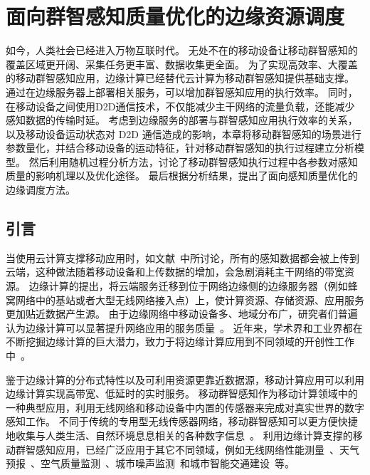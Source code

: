 

\chapter{面向群智感知质量优化的边缘资源调度}

如今，人类社会已经进入万物互联时代。
无处不在的移动设备让移动群智感知的覆盖区域更开阔、采集任务更丰富、数据收集更全面。
为了实现高效率、大覆盖的移动群智感知应用，边缘计算已经替代云计算为移动群智感知提供基础支撑。
通过在边缘服务器上部署相关服务，可以增加群智感知应用的执行效率。
同时，在移动设备之间使用D2D通信技术，不仅能减少主干网络的流量负载，还能减少感知数据的传输时延。
考虑到边缘服务的部署与群智感知应用执行效率的关系，以及移动设备运动状态对 D2D 通信造成的影响，本章将移动群智感知的场景进行参数量化，并结合移动设备的运动特征，针对移动群智感知的执行过程建立分析模型。
然后利用随机过程分析方法，讨论了移动群智感知执行过程中各参数对感知质量的影响机理以及优化途径。
最后根据分析结果，提出了面向感知质量优化的边缘调度方法。

\section{引言}

当使用云计算支撑移动应用时，如文献~\cite{DBLP:journals/fgcs/AntonicMPZ16,DBLP:conf/ccnc/MessaoudRG16}中所讨论，所有的感知数据都会被上传到云端，这种做法随着移动设备和上传数据的增加，会急剧消耗主干网络的带宽资源。
边缘计算的提出，将云端服务迁移到位于网络边缘侧的边缘服务器（例如蜂窝网络中的基站或者大型无线网络接入点）上，使计算资源、存储资源、应用服务更加贴近数据产生源。
由于边缘网络中移动设备多、地域分布广，研究者们普遍认为边缘计算可以显著提升网络应用的服务质量~\cite{DBLP:conf/sigcomm/BonomiMZA12}。
近年来，学术界和工业界都在不断挖掘边缘计算的巨大潜力，致力于将边缘计算应用到不同领域的开创性工作中~\cite{DBLP:journals/access/MarjanovicAZ18,DBLP:journals/iotj/ChiangZ16}。


鉴于边缘计算的分布式特性以及可利用资源更靠近数据源，移动计算应用可以利用边缘计算实现高带宽、低延时的实时服务。
移动群智感知作为移动计算领域中的一种典型应用，利用无线网络和移动设备中内置的传感器来完成对真实世界的数字感知工作。
不同于传统的专用型无线传感器网络，移动群智感知可以更方便快捷地收集与人类生活、自然环境息息相关的各种数字信息~\cite{DBLP:journals/cm/GuoCZYC16}。
利用边缘计算支撑的移动群智感知应用，已经广泛应用于其它不同领域，例如无线网络性能测量~\cite{DBLP:journals/cm/RosenLLCMB14}、天气预报~\cite{DBLP:journals/tpds/ZhaoMTL15}、空气质量监测~\cite{DBLP:conf/huc/ZhangXWC14}、城市噪声监测~\cite{DBLP:conf/huc/ZhengLWZLC14}和城市智能交通建设~\cite{DBLP:conf/icdcs/ZhouJL15}等。

